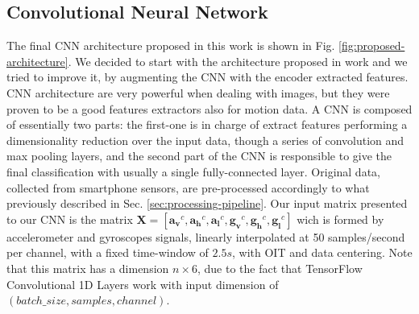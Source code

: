 \subsection{Convolutional Neural Network}
\label{subsec:cnn}
The final CNN architecture proposed in this work is shown in Fig. \ref{fig:proposed-architecture}. We decided to start with the architecture proposed in work \cite{ignatov2018real} and we tried to improve it, by augmenting the CNN with the encoder extracted features. CNN architecture are very powerful when dealing with images, but they were proven to be a good features extractors also for motion data. A CNN is composed of essentially two parts: the first-one is in charge of extract features performing a dimensionality reduction over the input data, though a series of convolution and max pooling layers, and the second part of the CNN is responsible to give the final classification with usually a single fully-connected layer. Original data, collected from smartphone sensors, are pre-processed accordingly to what previously described in Sec. \ref{sec:processing-pipeline}. Our input matrix presented to our CNN is the matrix \mbox{$ \boldsymbol{X} = [ \boldsymbol{a_{v}}^{c}, \boldsymbol{a_{h}}^{c}, \boldsymbol{a_{l}}^{c}, \boldsymbol{g_{v}}^{c}, \boldsymbol{g_{h}}^{c}, \boldsymbol{g_{l}}^{c}]$} wich is formed by accelerometer and gyroscopes signals, linearly interpolated at 50 samples/second per channel, with a fixed time-window of $2.5s$, with OIT and data centering. Note that this matrix has a dimension $n \times 6$, due to the fact that TensorFlow Convolutional 1D Layers work with input dimension of $(batch\_size, samples, channel)$.

